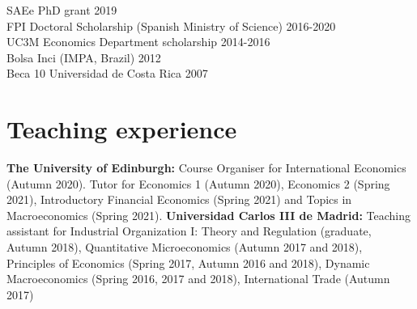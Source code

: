 \documentclass[margin]{res} %
\begin{document}
\begin{resume}
SAEe PhD grant \hfill 2019\\
FPI Doctoral Scholarship (Spanish Ministry of Science) \hfill 2016-2020 \\
UC3M Economics Department scholarship \hfill 2014-2016 \\
Bolsa Inci (IMPA, Brazil) \hfill 2012 \\
Beca 10 Universidad de Costa Rica \hfill 2007


\section{Teaching experience}

{\bf The University of Edinburgh:} Course Organiser for International Economics (Autumn 2020). Tutor for Economics 1 (Autumn 2020), Economics 2 (Spring 2021), Introductory Financial Economics (Spring 2021) and Topics in Macroeconomics (Spring 2021).
{\bf Universidad Carlos III de Madrid:} Teaching assistant for Industrial Organization I: Theory and Regulation (graduate, Autumn 2018), Quantitative Microeconomics (Autumn 2017 and 2018), Principles of Economics (Spring 2017, Autumn 2016 and 2018), Dynamic Macroeconomics (Spring 2016, 2017 and 2018), International Trade (Autumn 2017)



\end{resume}
\end{document}
